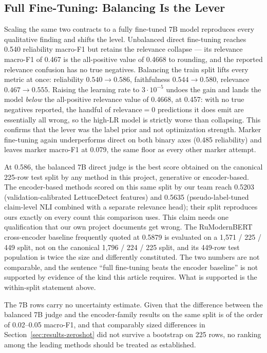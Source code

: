\documentclass{zapiski}
\begin{document}
\subsection{Full Fine-Tuning: Balancing Is the Lever}
\label{sec:results-fullft}

Scaling the same two contracts to a fully fine-tuned 7B model reproduces every
qualitative finding and shifts the level. Unbalanced direct fine-tuning
reaches 0.540 reliability macro-F1 but retains the relevance collapse ---
its relevance macro-F1 of 0.467 is the all-positive value of 0.4668 to
rounding, and the reported relevance confusion has no true negatives.
Balancing the train split lifts every metric at once: reliability
$0.540 \to 0.586$, faithfulness $0.544 \to 0.580$, relevance
$0.467 \to 0.555$. Raising the learning rate to $3\cdot10^{-5}$ undoes the
gain and lands the model \emph{below} the all-positive relevance value of
0.4668, at 0.457: with no true negatives reported, the handful of
$\mathrm{relevance}=0$ predictions it does emit are essentially all wrong, so
the high-LR model is strictly worse than collapsing. This confirms that the
lever was the label prior and not optimization strength. Marker fine-tuning again
underperforms direct on both binary axes (0.485 reliability) and leaves marker
macro-F1 at 0.079, the same floor as every other marker attempt.

At 0.586, the balanced 7B direct judge is the best score obtained on the
canonical 225-row test split by any method in this project, generative or
encoder-based. The encoder-based methods scored on this same split by our team
reach 0.5203 (validation-calibrated LettuceDetect features) and 0.5635
(pseudo-label-tuned claim-level NLI combined with a separate relevance head);
their split reproduces ours exactly on every count this comparison uses.
This claim needs one qualification that our own project documents get wrong. The RuModernBERT cross-encoder baseline frequently quoted
at 0.5879 is evaluated on a 1,571 / 225 / 449 split, not on the canonical
1,796 / 224 / 225 split, and its 449-row test population is twice the size and
differently constituted. The two numbers are not comparable, and the sentence
``full fine-tuning beats the encoder baseline'' is not supported by evidence
of the kind this article requires. What is supported is the within-split
statement above.

The 7B rows carry no uncertainty estimate. Given that the difference between
the balanced 7B judge and the encoder-family results on the same split is of
the order of 0.02--0.05 macro-F1, and that comparably sized differences in
Section~\ref{sec:results-zeroshot} did not survive a bootstrap on 225 rows, no
ranking among the leading methods should be treated as established.
\end{document}
